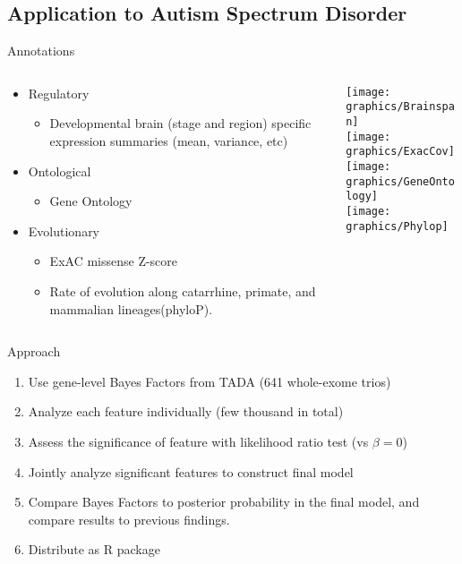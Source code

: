 \documentclass[bigger]{beamer}
\begin{document}
\subsection{Application to Autism Spectrum Disorder}
\begin{frame}{Annotations}
  \begin{columns}
    \begin{column}{0.7\textwidth}
      \begin{itemize}
      \item  Regulatory
        \begin{itemize}
        \item Developmental brain (stage and region) specific expression summaries (mean, variance, etc)
        \end{itemize}  
      \item Ontological
        \begin{itemize}
        \item Gene Ontology
        \end{itemize}
      \item Evolutionary
        \begin{itemize}
        \item ExAC missense Z-score
        \item Rate of evolution along catarrhine, primate, and mammalian lineages(phyloP).
        \end{itemize}
      \end{itemize}
    \end{column}
    \begin{column}{0.3\textwidth}
      \texttt{[image: graphics/Brainspan]} \\
      \texttt{[image: graphics/ExacCov]} \\
      \texttt{[image: graphics/GeneOntology]} \\
      \texttt{[image: graphics/Phylop]} \\
    \end{column}
  \end{columns}
\end{frame}

\begin{frame}{Approach}
  \begin{enumerate}
  \item Use gene-level Bayes Factors from TADA (641 whole-exome trios)
  \item Analyze each feature individually (few thousand in total)
  \item Assess the significance of feature with likelihood ratio test (vs $\beta=0$)
  \item Jointly analyze significant features to construct final model
  \item Compare Bayes Factors to posterior probability in the final model, and compare results to previous findings. 
  \item Distribute as R package 
  \end{enumerate}
\end{frame}
\end{document}
